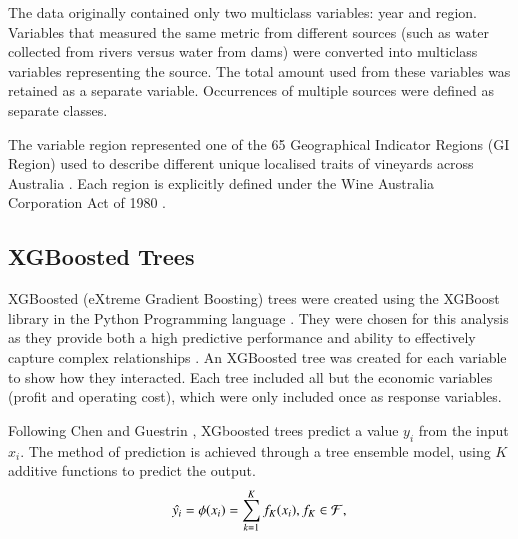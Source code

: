 \documentclass[review,12pt,authoryear]{elsarticle}
\begin{document}
\begin{linenumbers}
The data originally contained only two multiclass variables: year and region. Variables that measured the same metric from different sources (such as water collected from rivers versus water from dams) were converted into multiclass variables representing the source. The total amount used from these variables was retained as a separate variable. Occurrences of multiple sources were defined as separate classes. 
\par
The variable region represented one of the 65 Geographical Indicator Regions (GI Region) used to describe different unique localised traits of vineyards across Australia \citep{hallidayAustralianWineEncyclopedia2009,oliverReviewSoilPhysical2013,soarClimateDriversRed2008}. Each region is explicitly defined under the Wine Australia Corporation Act of 1980 \citep{attorney-generalsdepartmentWineAustraliaCorporation2010}.
\par
%
%

%
%
\subsection{XGBoosted Trees}
XGBoosted (eXtreme Gradient Boosting) trees were created using the XGBoost library \citep{chenXGBoostScalableTree2016} in the Python Programming language \citep{g.vanrossumPythonTutorialTechnical1995}. They were chosen for this analysis as they provide both a 
high predictive performance %
and ability to effectively 
capture complex relationships %
. An XGBoosted tree was created for each variable to show how they interacted. Each tree included all but the economic variables (profit and operating cost), which were only included once as response variables.
\par
Following Chen and Guestrin \citep{chenXGBoostScalableTree2016}, XGboosted trees predict a value $y_i$ from the input $x_i$. The method of prediction is achieved through a tree ensemble model, using $K$ additive functions to predict the output. 
\begin{equation}
 \hat{y_i}=\phi(x_i)=\sum_{k=1}^{K}{f_{K}(x_{i})}, \space f_{K}\in \mathcal{F},
\end{equation}



\end{linenumbers}
\end{document}
